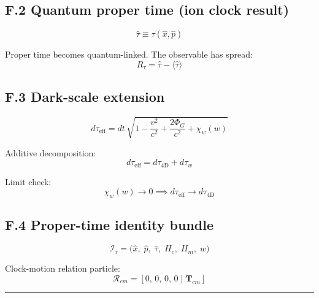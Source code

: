 \documentclass[11pt, a4paper, oneside]{article}
\theoremstyle{definition}
\theoremstyle{plain}
\theoremstyle{remark}
\begin{document}
\subsection*{F.2 Quantum proper time (ion clock result)}

\begin{equation}
  \hat{\tau} \equiv \tau(\hat{x}, \hat{p})
  \tag{F.3}
\end{equation}

Proper time becomes quantum-linked. The observable has spread:
\begin{equation}
  R_\tau = \hat{\tau} - \langle\hat{\tau}\rangle
  \tag{F.4}
\end{equation}

\subsection*{F.3 Dark-scale extension}

\begin{equation}
  \boxed{
	d\tau_\text{eff}
	= dt\,\sqrt{
		1 - \frac{v^2}{c^2} + \frac{2\Phi_G}{c^2} + \chi_w(w)
	  }
  }
  \tag{F.5}
\end{equation}

Additive decomposition:
\begin{equation}
  d\tau_\text{eff} = d\tau_\text{4D} + d\tau_w
  \tag{F.6}
\end{equation}

Limit check:
\begin{equation}
  \chi_w(w) \to 0 \implies d\tau_\text{eff} \to d\tau_\text{4D}
  \tag{F.7}
\end{equation}

\subsection*{F.4 Proper-time identity bundle}

\begin{equation}
  \mathcal{I}_\tau
  = \bigl(\hat{x},\; \hat{p},\; \hat{\tau},\; H_c,\; H_m,\; w\bigr)
  \tag{F.8}
\end{equation}

Clock-motion relation particle:
\begin{equation}
  \mathcal{R}_{cm} = [0,\, 0,\, 0,\, 0 \mid \mathbf{T}_{cm}]
  \tag{F.9}
\end{equation}

\noindent\rule{\linewidth}{0.4pt}

\end{document}
